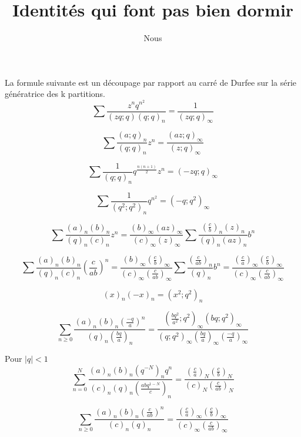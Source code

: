 \documentclass[a4paper,11pt]{article}
\title{Identités qui font pas bien dormir}
\author{Nous}
\begin{document}
\maketitle
La formule suivante est un découpage par rapport au carré de Durfee sur la série
génératrice des k partitions.
$$\sum \frac{z^nq^{n^2}}{(zq;q)(q;q)_n}=\frac{1}{(zq;q)_\infty}$$

$$\sum \frac{(a;q)_n}{(q;q)_n}z^n=\frac{(az;q)_\infty}{(z;q)_\infty}$$

$$\sum \frac{1}{(q;q)_n}q^{\frac{n(n+1)}{2}}z^n=(-zq;q)_\infty$$

$$\sum \frac{1}{(q^2;q^2)_n}q^{n^2}=(-q;q^2)_\infty$$


$$\sum
\frac{(a)_n(b)_n}{(q)_n(c)_n}z^n=
\frac{(b)_\infty(az)_\infty}{(c)_\infty(z)_\infty}
\sum \frac{(\frac{c}{b})_n(z)_n}{(q)_n(az)_n}b^n$$

$$\sum
\frac{(a)_n(b)_n}{(q)_n(c)_n}(\frac{c}{ab})^n=
\frac{(b)_\infty(\frac{c}{b})_\infty}{(c)_\infty(\frac{c}{ab})_\infty}
\sum
\frac{(\frac{c}{ab})_n}{(q)_n}b^n=\frac{(\frac{c}{a})_\infty(\frac{c}{b})_\infty}{(c)_\infty
(\frac{c}{ab})_\infty}$$

$$(x)_n(-x)_n=(x^2;q^2)_n $$

$$
\sum_{n \geq 0}
\frac{(a)_n (b)_n (\frac{-q}{a})^n}{(q)_n (\frac{bq}{a})_n} = 
\frac{(\frac{bq^2}{a^2};q^2)_\infty (bq;q^2)_\infty}{(q;q^2)_\infty (\frac{bq}{a})_\infty (\frac{-q}{a})_\infty}
$$

Pour $|q| < 1$
$$
\sum_{n=0}^N
\frac{(a)_n (b)_n (q^{-N})_n q^n}{(c)_n(q)_n(\frac{abq^{1-N}}{c})_n} =
\frac{(\frac{c}{a})_N (\frac{c}{b})_N}{(c)_N (\frac{c}{ab})_N}
$$



$$
\sum_{n \geq 0}
\frac{(a)_n (b)_n (\frac{c}{ab})^n}{(c)_n(q)_n} =
\frac{(\frac{c}{a})_\infty (\frac{c}{b})_\infty}{(c)_\infty (\frac{c}{ab})_\infty}
$$
\end{document}
